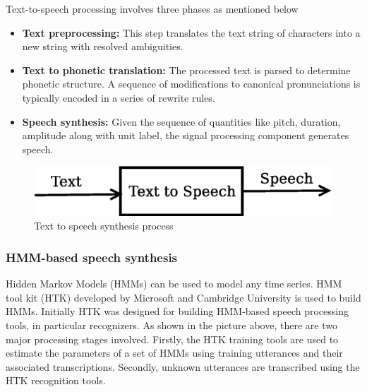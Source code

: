 \documentclass{article}
\begin{document}
Text-to-speech processing involves three phases as mentioned below
\begin{itemize}
\item {\bf Text preprocessing:} This step translates the text string of characters into
a new string with resolved ambiguities.
\item {\bf Text to phonetic translation:} The processed text is parsed to determine
phonetic structure. A sequence of modifications to canonical pronunciations is typically
encoded in a series of rewrite rules.
\item {\bf Speech synthesis:} Given the sequence of quantities like pitch, duration, amplitude along with unit label, the signal processing component generates speech.
\end{itemize}

\begin{figure}[h]
\centering
\includegraphics[scale=0.35]{figures/tts.eps}
\caption{Text to speech synthesis process}
\label{fig:ttsBlock}
\end{figure}

\subsubsection{HMM-based speech synthesis}
\label{ssec:hmm}
Hidden Markov Models (HMMs) can be used to model any time series. HMM tool kit (HTK) developed by Microsoft and Cambridge University is used to build HMMs. Initially HTK was
designed for building HMM-based speech processing tools, in particular recognizers. As 
shown in the picture above, there are two major processing stages involved. Firstly, the HTK training tools are used to estimate the parameters of a set of HMMs using training
utterances and their associated transcriptions. Secondly, unknown utterances are
transcribed using the HTK recognition tools.
\end{document}
